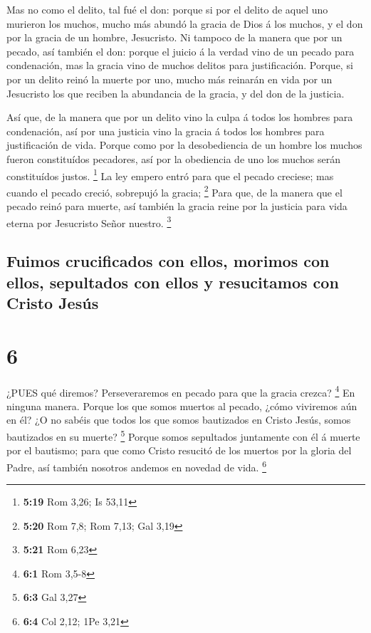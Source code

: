  Mas no como el delito, tal fué el don: porque si por el
delito de aquel uno murieron los muchos, mucho más abundó la gracia de
Dios á los muchos, y el don por la gracia de un hombre, Jesucristo.
 Ni tampoco de la manera que por un pecado, así también el
don: porque el juicio á la verdad vino de un pecado para condenación,
mas la gracia vino de muchos delitos para justificación. 
Porque, si por un delito reinó la muerte por uno, mucho más reinarán en
vida por un Jesucristo los que reciben la abundancia de la gracia, y del
don de la justicia.

 Así que, de la manera que por un delito vino la culpa á
todos los hombres para condenación, así por una justicia vino la gracia
á todos los hombres para justificación de vida.  Porque
como por la desobediencia de un hombre los muchos fueron constituídos
pecadores, así por la obediencia de uno los muchos serán constituídos
justos. \footnote{\textbf{5:19} Rom 3,26; Is 53,11}  La ley
empero entró para que el pecado creciese; mas cuando el pecado creció,
sobrepujó la gracia; \footnote{\textbf{5:20} Rom 7,8; Rom 7,13; Gal 3,19}
 Para que, de la manera que el pecado reinó para muerte,
así también la gracia reine por la justicia para vida eterna por
Jesucristo Señor nuestro. \footnote{\textbf{5:21} Rom 6,23}

\hypertarget{fuimos-crucificados-con-ellos-morimos-con-ellos-sepultados-con-ellos-y-resucitamos-con-cristo-jesuxfas}{%
\subsection{Fuimos crucificados con ellos, morimos con ellos, sepultados
con ellos y resucitamos con Cristo
Jesús}\label{fuimos-crucificados-con-ellos-morimos-con-ellos-sepultados-con-ellos-y-resucitamos-con-cristo-jesuxfas}}

\hypertarget{section-5}{%
\section{6}\label{section-5}}

 ¿PUES qué diremos? Perseveraremos en pecado para que la
gracia crezca? \footnote{\textbf{6:1} Rom 3,5-8}  En ninguna
manera. Porque los que somos muertos al pecado, ¿cómo viviremos aún en
él?  ¿O no sabéis que todos los que somos bautizados en
Cristo Jesús, somos bautizados en su muerte? \footnote{\textbf{6:3} Gal
  3,27}  Porque somos sepultados juntamente con él á muerte
por el bautismo; para que como Cristo resucitó de los muertos por la
gloria del Padre, así también nosotros andemos en novedad de vida.
\footnote{\textbf{6:4} Col 2,12; 1Pe 3,21}

